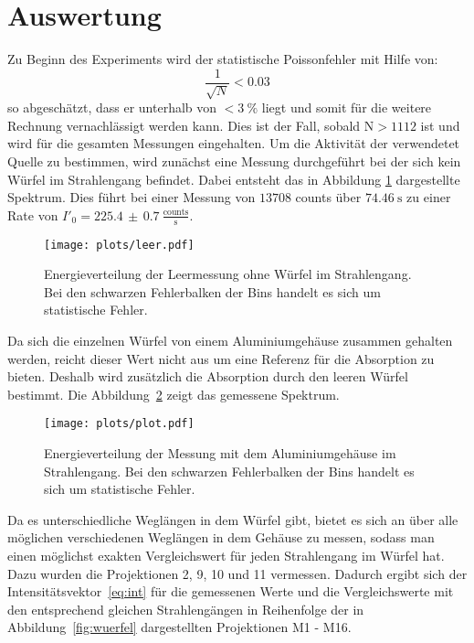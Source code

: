 \section{Auswertung}
Zu Beginn des Experiments wird der statistische Poissonfehler mit Hilfe von:
\begin{equation*}
  \frac{1}{\sqrt{N}} < 0.03
\end{equation*}
so abgeschätzt, dass er unterhalb von $<\SI{3}{\percent}$ liegt und somit für die weitere
Rechnung vernachlässigt werden kann. Dies ist der Fall, sobald $\text{N}>1112$
ist und wird für die gesamten Messungen eingehalten. Um die Aktivität der verwendetet Quelle zu bestimmen, wird zunächst eine Messung durchgeführt bei der sich kein Würfel im Strahlengang befindet. Dabei entsteht das in Abbildung \ref{fig:leer} dargestellte Spektrum. Dies führt bei einer Messung von $13708$ counts über $\SI{74.46}{\second}$ zu einer Rate von $I'_0 = 225.4\,\pm\,0.7\:\frac{\text{counts}}{\text{s}}$.

\begin{figure}
  \centering
  \texttt{[image: plots/leer.pdf]}
  \caption{Energieverteilung der Leermessung ohne Würfel im Strahlengang. Bei den schwarzen Fehlerbalken der Bins handelt es sich um statistische Fehler.}
  \label{fig:leer}
\end{figure}

Da sich die einzelnen Würfel von einem Aluminiumgehäuse zusammen gehalten werden, reicht dieser Wert nicht aus um eine Referenz für die Absorption zu bieten. Deshalb wird zusätzlich die Absorption durch den leeren Würfel bestimmt.
Die Abbildung~\ref{fig:alu} zeigt das gemessene Spektrum.

\begin{figure}
  \centering
  \texttt{[image: plots/plot.pdf]}
  \caption{Energieverteilung der Messung mit dem Aluminiumgehäuse im Strahlengang. Bei den schwarzen Fehlerbalken der Bins handelt es sich um statistische Fehler.}
  \label{fig:alu}
\end{figure}

Da es unterschiedliche Weglängen in dem Würfel gibt, bietet es sich an über alle möglichen verschiedenen Weglängen in dem Gehäuse zu messen, sodass man einen möglichst exakten Vergleichswert für jeden Strahlengang im Würfel hat. Dazu wurden die Projektionen 2, 9, 10 und 11 vermessen. Dadurch ergibt sich der Intensitätsvektor~\ref{eq:int} für die gemessenen Werte und die Vergleichswerte mit den entsprechend gleichen Strahlengängen in Reihenfolge der in Abbildung~\ref{fig:wuerfel} dargestellten Projektionen M1 - M16.

